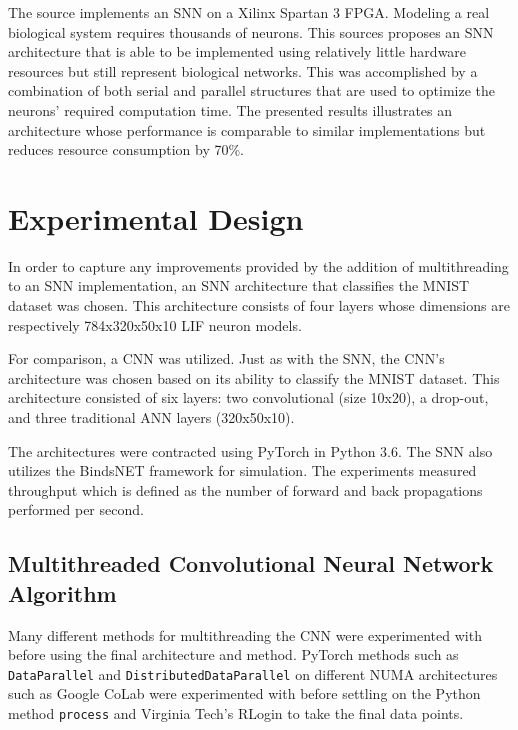 \documentclass[journal]{IEEEtran}
\begin{document}

The source \cite{iakymchuk2012fast} implements an SNN on a Xilinx Spartan 3 FPGA. Modeling a real biological system requires thousands of neurons. This sources proposes an SNN architecture that is able to be implemented using relatively little hardware resources but still represent biological networks. This was accomplished by a combination of both serial and parallel structures that are used to optimize the neurons' required computation time. The presented results illustrates an architecture whose performance is comparable to similar implementations but reduces resource consumption by 70\%.

\section{Experimental Design}
In order to capture any improvements provided by the addition of multithreading to an SNN implementation, an SNN architecture that classifies the MNIST dataset was chosen. This architecture consists of four layers whose dimensions are respectively 784x320x50x10 LIF neuron models. 
\par
For comparison, a CNN was utilized. Just as with the SNN, the CNN's architecture was chosen based on its ability to classify the MNIST dataset. This architecture consisted of six layers: two convolutional (size 10x20), a drop-out, and three traditional ANN layers (320x50x10).
\par
The architectures were contracted using PyTorch in Python 3.6. The SNN also utilizes the BindsNET framework for simulation. The experiments measured throughput which is defined as the number of forward and back propagations performed per second.  

\subsection{Multithreaded Convolutional Neural Network Algorithm}

Many different methods for multithreading the CNN were experimented with before using the final architecture and method. PyTorch methods such as \verb|DataParallel| and \verb|DistributedDataParallel| on different NUMA architectures such as Google CoLab were experimented with before settling on the Python method \verb|process| and Virginia Tech's RLogin to take the final data points.
\end{document}
